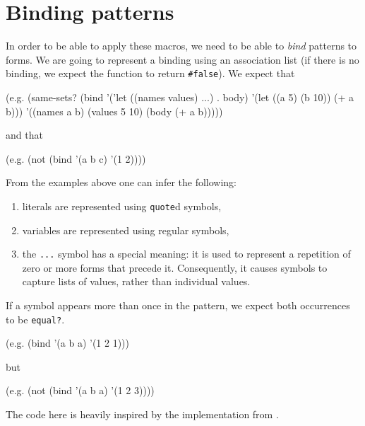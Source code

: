 \section{Binding patterns}

In order to be able to apply these macros, we need to be able to \textit{bind}
patterns to forms. We are going to represent a binding using an association
list (if there is no binding, we expect the function to return \texttt{\#false}).
We expect that
\begin{Snippet}
  (e.g. (same-sets? (bind '('let ((names values) ...) . body)
                          '(let ((a 5) (b 10)) (+ a b)))
                    '((names a b) (values 5 10) (body (+ a b)))))
\end{Snippet}
and that
\begin{Snippet}
  (e.g. (not (bind '(a b c) '(1 2))))
\end{Snippet}

From the examples above one can infer the following:
\begin{enumerate}
\item literals are represented using \texttt{quote}d symbols,
\item variables are represented using regular symbols,
\item the \texttt{...} symbol has a special meaning: it is used
  to represent a repetition of zero or more forms that precede it.
  Consequently, it causes symbols to capture lists of values,
  rather than individual values.
\end{enumerate}

If a symbol appears more than once in the pattern, we expect both
occurrences to be \texttt{equal?}.

\begin{Snippet}
  (e.g. (bind '(a b a) '(1 2 1)))
\end{Snippet}

but

\begin{Snippet}
  (e.g. (not (bind '(a b a) '(1 2 3))))
\end{Snippet}

The code here is heavily inspired by the implementation from \cite{Norvig1992}.

